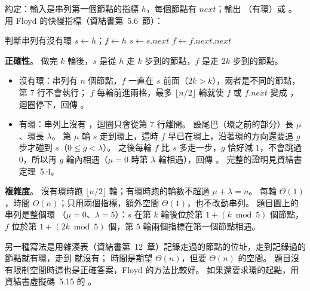 \begin{pastsoln}
約定：輸入是串列第一個節點的指標 $h$，每個節點有 $\mathit{next}$；輸出 \TRUE（有環）或 \FALSE。 用
Floyd 的快慢指標（資結書第~5.6~節）：

\begin{pseudo}[unbreakable]{判斷串列有沒有環}
    \State $s \gets h$；$f \gets h$ 
        \State $s \gets s.\mathit{next}$ 
        \State $f \gets f.\mathit{next}.\mathit{next}$ 
            \State \Return \TRUE
        \EndIf
    \EndWhile
    \State \Return \FALSE
\EndFunction
\end{pseudo}

\textbf{正確性}。 做完 $k$ 輪後，$s$ 是從 $h$ 走 $k$ 步到的節點，$f$ 是走 $2k$ 步到的節點。
\begin{itemize}
\item 沒有環：串列有 $n$ 個節點，$f$ 一直在 $s$ 前面（$2k > k$），兩者是不同的節點，第 7 行不會執行；
$f$ 每輪前進兩格，最多 $\lfloor n/2 \rfloor$ 輪就使 $f$ 或 $f.\mathit{next}$ 變成 \NIL，迴圈停下，回傳
\FALSE。
\item 有環：串列上沒有 \NIL，迴圈只會從第 7 行離開。 設尾巴（環之前的部分）長 $\mu$、環長 $\lambda$。
第 $\mu$ 輪 $s$ 走到環上，這時 $f$ 早已在環上，沿著環的方向還要追 $g$ 步才碰到 $s$（$0 \le g < \lambda$）。
之後每輪 $f$ 比 $s$ 多走一步，$g$ 恰好減 $1$，不會跳過 $0$，所以再 $g$ 輪內相遇（$\mu = 0$ 時第 $\lambda$
輪相遇），回傳 \TRUE。 完整的證明見資結書定理~5.4。
\end{itemize}

\textbf{複雜度}。 沒有環時跑 $\lfloor n/2 \rfloor$ 輪；有環時跑的輪數不超過 $\mu + \lambda = n$。 每輪
$\Theta(1)$，時間 $O(n)$；只用兩個指標，額外空間 $\Theta(1)$，也不改動串列。 題目圖上的串列是整個環
（$\mu = 0$、$\lambda = 5$）：$s$ 在第 $k$ 輪後位於第 $1 + (k \bmod 5)$ 個節點，$f$ 位於第
$1 + (2k \bmod 5)$ 個，第 $5$ 輪兩個指標在第一個節點相遇。

另一種寫法是用雜湊表（資結書第~12~章）記錄走過的節點的位址，走到記錄過的節點就有環，走到 \NIL 就沒有；
時間是期望 $\Theta(n)$，但要 $\Theta(n)$ 的空間。 題目沒有限制空間時這也是正確答案，Floyd 的方法比較好。
如果還要求環的起點，用資結書虛擬碼~5.15 的 。
\end{pastsoln}
